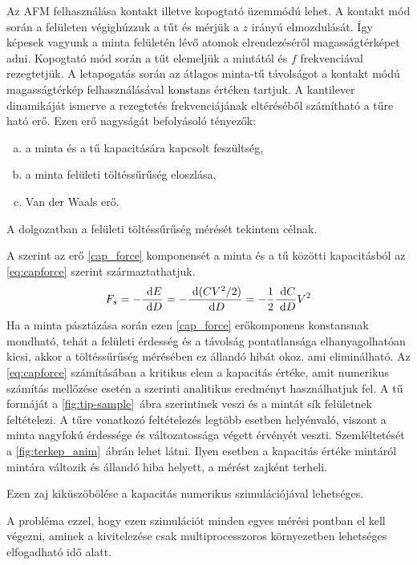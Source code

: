 	Az AFM felhasználása kontakt illetve kopogtató üzemmódú lehet. A kontakt mód során a
	felületen végighúzzuk a tűt és mérjük a $z$ irányú elmozdulását. Így képesek vagyunk a minta
	felületén lévő atomok elrendezéséről magasságtérképet adni.
	Kopogtató mód \cite{Martin1987} során a tűt elemeljük a mintától és $f$ frekvenciával rezegtetjük.
	A letapogatás során az  átlagos minta-tű távolságot a kontakt módú magasságtérkép felhasználásával
	konstans értéken tartjuk.
	A kantilever dinamikáját ismerve a rezegtetés frekvenciájának eltéréséből
	számítható a tűre ható erő. Ezen erő nagyságát befolyásoló tényezők:
	\begin{enumerate}[a)]
		\item a minta és a tű kapacitására kapcsolt feszültség,\label{cap_force}
		\item a minta felületi töltéssűrűség eloszlása,\label{sc_force}
		\item Van der Waals erő.\label{vdw_force}
	\end{enumerate}
	A dolgozatban a felületi töltéssűrűség mérését tekintem célnak.
	
	A \cite{Butt1991Dec, Butt20051} szerint az erő \ref{cap_force} komponensét a minta és a tű közötti
	kapacitásból az \eqref{eq:capforce} szerint származtathatjuk.
	\begin{equation}\label{eq:capforce} 
	F_{s} = -\frac{\ \mathrm{d} E}{\ \mathrm{d} D} = -\frac{\ \mathrm{d} (CV^2 /2)}{\ \mathrm{d} D} = -\frac12 \frac{\ \mathrm{d} C}{\ \mathrm{d} D} V^2   
	\end{equation}
	Ha a minta pásztázása során ezen \ref{cap_force} erőkomponens konstansnak mondható, tehát a felületi
	érdesség és a távolság pontatlansága elhanyagolhatóan kicsi, akkor a töltéssűrűség mérésében ez állandó hibát okoz. ami
	eliminálható.
	Az \eqref{eq:capforce} számításában a kritikus elem a kapacitás értéke, amit numerikus számítás
	mellőzése esetén a \cite{Hudlet1998} szerinti analitikus eredményt használhatjuk fel.
	A tű formáját a \ref{fig:tip-sample}~ábra szerintinek veszi és a mintát sík felületnek feltételezi.
	A tűre vonatkozó feltételezés legtöbb esetben helyénvaló, viszont a minta nagyfokú érdessége és változatossága végett érvényét
	veszti. Szemléltetését a \ref{fig:terkep_anim}~ábrán lehet látni. 
	Ilyen esetben a kapacitás értéke mintáról mintára változik és állandó hiba helyett, a mérést zajként terheli.
	\begin{center}
		Ezen zaj kiküszöbölése a kapacitás numerikus szimulációjával lehetséges.
	\end{center}
	A probléma ezzel, hogy ezen szimulációt minden egyes mérési pontban el kell végezni, aminek a kivitelezése
	csak multiprocesszoros környezetben lehetséges elfogadható idő alatt.
	
